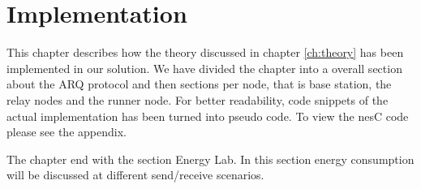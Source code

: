 \chapter{Implementation}\label{ch:implementation}

This chapter describes how the theory discussed in chapter \ref{ch:theory} has been implemented in our solution. We have divided the chapter into a overall section about the ARQ protocol and then sections per node, that is base station, the relay nodes and the runner node. For better readability, code snippets of the actual implementation has been turned into pseudo code. To view the nesC code please see the appendix.

\noindent The chapter end with the section Energy Lab. In this section energy consumption will be discussed at different send/receive scenarios.









